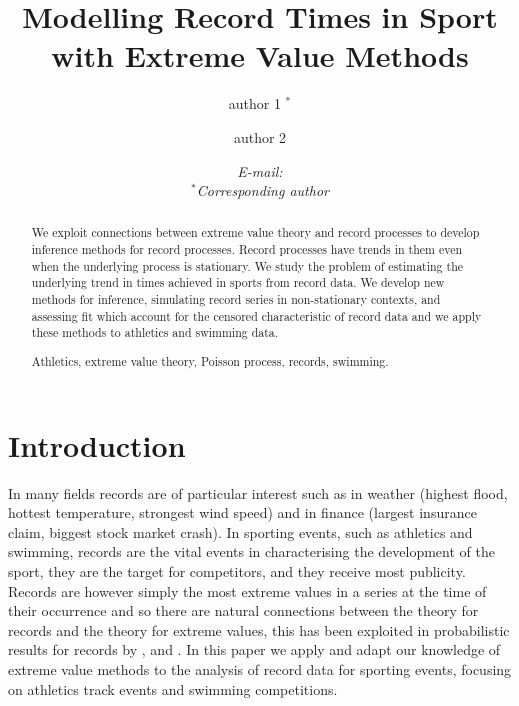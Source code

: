 \documentclass[10pt]{article}
\title{\Large \bf Modelling Record Times in Sport with Extreme Value Methods}
\author[1]{author 1 $^*$}
\author[2]{author 2 }
\affil[1]{affil 1}
\affil[2]{affil 2}
\date{\vspace*{-2\baselineskip}}
\date{\textit{E-mail:  \\$^*$Corresponding author}}
\begin{document}
\maketitle 
\thispagestyle{fancy2}

\begin{abstract} \noindent
We exploit connections between extreme value theory and record processes
to develop inference methods for record processes. Record processes have
trends in them even when the underlying process is stationary. We study
the problem of estimating the underlying trend in times achieved in
sports from record data. We develop new methods for inference,
simulating record series in non-stationary contexts, and assessing fit
which account for the censored characteristic of record data and we
apply these methods to athletics and swimming data.

\begin{keywords}
Athletics, extreme value theory, Poisson process, records, swimming.

\end{keywords}
\end{abstract} \vspace{\fill} \newpage
\section{Introduction} \label{introduction}
	
In many fields records are of particular interest such as in weather
(highest flood, hottest temperature, strongest wind speed) and in
finance (largest insurance claim, biggest stock market crash).
In sporting events, such as athletics and swimming, records are the vital 
events in characterising the development of the sport, they are the
target for competitors, and they receive most publicity.
Records are however simply the most extreme values in a series at the
time of their occurrence and so there are natural connections 
between the theory for records and the theory for extreme values, this
has been exploited in probabilistic results for records by
\cite{bar,Ahsan}, \cite{Glick78, Smith1988, Ahs, Dav, Bai, Sibuya}
and \cite{Benestad2004}. In this paper we apply and adapt 
our knowledge of extreme value methods to the analysis of record data 
for sporting events, focusing on athletics track events 
and swimming competitions. 
\end{document}
